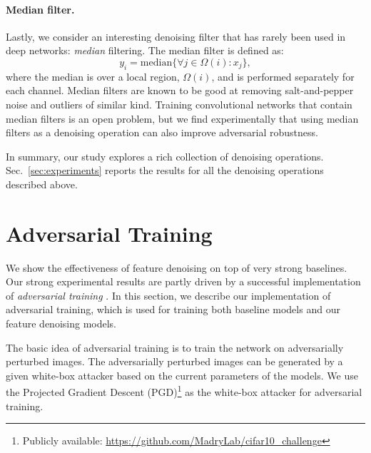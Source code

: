 \documentclass[10pt,twocolumn,letterpaper]{article}
\begin{document}
\paragraph{Median filter.} Lastly, we consider an interesting denoising filter that has rarely been used in deep networks: \emph{median} filtering. The median filter is defined as:
\begin{equation}
\label{eq:median}
y_i = \text{median}\{\forall j \in \Omega(i): x_j \},
\end{equation}
where the median is over a local region, $\Omega(i)$, and is performed separately for each channel.
Median filters are known to be good at removing salt-and-pepper noise and outliers of similar kind. Training convolutional networks that contain median filters is an open problem, but we find experimentally that using median filters as a denoising operation can also improve adversarial robustness.

\vspace{1em}
In summary, our study explores a rich collection of denoising operations. Sec.~\ref{sec:experiments} reports the results for all the denoising operations described above.

\section{Adversarial Training}\label{sec:advtrain}

We show the effectiveness of feature denoising on top of very strong baselines. Our strong experimental results are partly driven by a successful implementation of \emph{adversarial training} \cite{Goodfellow2015,Madry2018}. In this section, we describe our implementation of adversarial training, which is used for training both baseline models and our feature denoising models.

The basic idea of adversarial training \cite{Goodfellow2015,Madry2018} is to train the network on adversarially perturbed images. The adversarially perturbed images can be generated by a given white-box attacker based on the current parameters of the models. We use the Projected Gradient Descent (PGD)\footnote{Publicly available: \fontsize{5.9pt}{1em}\selectfont \url{https://github.com/MadryLab/cifar10_challenge}} \cite{Madry2018} as the white-box attacker for adversarial training. 
\end{document}
